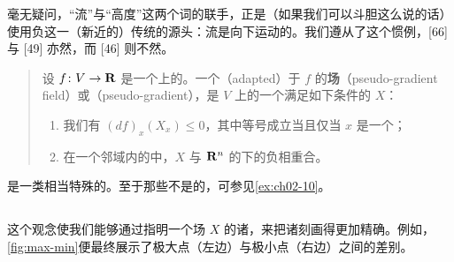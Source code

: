 \begin{remark}\label{thm:negative-gradient-convention}
毫无疑问，“流”与“高度”这两个词的联手，正是（如果我们可以斗胆这么说的话）使用负\trGradient{}这一（新近的）传统的源头：流是向下运动的。我们遵从了这个惯例，[66] 与 [49] 亦然，而 [46] 则不然。
\end{remark}

\begin{quote}
设 $f\colon V\to\mathbf{R}$ 是一个\trManifold{}上的\trMorseFunction。一个\textbf{\trAdapted}（adapted）于 $f$ 的\textbf{\trPseudogradient{}场}（pseudo-gradient field）或\textbf{\trPseudogradient}（pseudo-gradient），是 $V$ 上的一个满足如下条件的\trVectorField{} $X$：
\begin{enumerate}[label=(\arabic*)]
\item 我们有 $(df)_x(X_x)\le 0$，其中等号成立当且仅当 $x$ 是一个\trCriticalPoint；
\item 在一个\trCriticalPoint{}邻域内的\trMorseChart{}中，$X$ 与 $\mathbf{R}^n$ 的\trCanonical\trMetric{}下的负\trGradient{}相重合。
\end{enumerate}
\end{quote}

\begin{remark}\label{thm:pseudogradient-particular}
\trPseudogradient{}是一类相当特殊的\trVectorField。至于那些不是\trPseudogradient{}的\trVectorField，可参见\cref{ex:ch02-10}。
\end{remark}

\subsection{\trMorseChart}
\label{subsec:morse-charts}

这个观念使我们能够通过指明一个\trPseudogradient{}场 $X$ 的诸\trTrajectory，来把诸\trMorseChart{}刻画得更加精确。例如，\cref{fig:max-min}便最终展示了极大点（左边）与极小点（右边）之间的差别。

